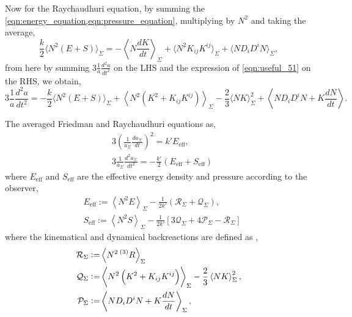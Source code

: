 Now for the Raychaudhuri equation, by summing the \cref{eqn:energy_equation,eqn:pressure_equation}, multiplying by $N^2$ and taking the average,
\begin{equation}
    \frac{k}{2}\langle N^2(E+S)\rangle_\Sigma=-\left\langle N\frac{dK}{dt}\right\rangle_\Sigma+\langle N^2K_{ij}K^{ij}\rangle_\Sigma+\langle ND_iD^iN\rangle_\Sigma,
\end{equation}
from here by summing $3\frac{1}{a}\frac{d^2a}{dt^2}$ on the LHS and the expression of \cref{eqn:useful_51} on the RHS, we obtain,
\begin{equation}
    3\frac{1}{a}\frac{d^2a}{dt^2}=-\frac{k}{2}\langle N^2(E+S)\rangle_\Sigma+\left\langle N^2(K^2+K_{ij}K^{ij})\right\rangle_{\Sigma}-\frac{2}{3}\langle NK\rangle^2_\Sigma+\left\langle ND_iD^i N+K\frac{dN}{dt}\right\rangle.\nonumber
\end{equation}





The averaged Friedman and Raychaudhuri equations as,
\begin{align}
    &3\left(\frac{1}{a_\Sigma}\frac{da_\Sigma}{dt}\right)^2=k'E_{\mathrm{eff}},\label{eqn:friedman_eqs_jf_1}\\
    &3\frac{1}{a_{\Sigma}}\frac{d^2a_{\Sigma}}{dt^2}=-\frac{k'}{2}\left(E_{\mathrm{eff}}+S_{\mathrm{eff}}\right)\label{eqn:raychaud_eqs_jf_1}
\end{align}
where $E_{\mathrm{eff}}$ and $S_{\mathrm{eff}}$ are the effective energy density and pressure according to the observer,
\begin{align}
    &E_{\mathrm{eff}}:=\left\langle N^2E\right\rangle_{\Sigma}-\frac{1}{2k'}\left(\mathcal{R}_\Sigma+\mathcal{Q}_{\Sigma}\right),
    \label{eqn:E_eff_1}\\
    &S_{\mathrm{eff}}:=\left\langle N^2 S\right\rangle_{\Sigma}-\frac{1}{2k'}\left[3\mathcal{Q}_{\Sigma}+4\mathcal{P}_{\Sigma}-\mathcal{R}_\Sigma\right]\label{eqn:S_eff_1}
\end{align}
where the kinematical and dynamical backreactions are defined as \cite{Buchert_2020}, 
\begin{align}
    \mathcal{R}_\Sigma :=&\left\langle N^2 \prescript{(3)}{}{R}\right\rangle_{\Sigma}\\
    \mathcal{Q}_{\Sigma}:=& \left\langle N^2\left(K^2+K_{ij}K^{ij}\right)\right\rangle_{\Sigma}-\frac{2}{3}\left\langle NK\right\rangle_{\Sigma}^2, \\
    \mathcal{P}_{\Sigma}:= &\left\langle N D_i D^i N+K\frac{dN}{dt}\right\rangle_{\Sigma},
\end{align}

